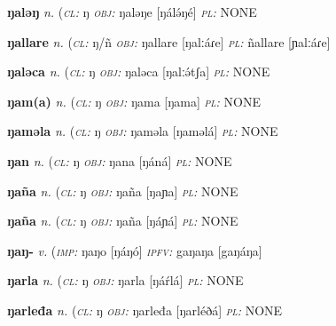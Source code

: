 {\newentry
\headword\textbf{ŋaləŋ}  
\ipa{[ŋálə́ŋ]}
\synpos\textit{n.} 
\class(\textit{\textsc{cl:}} {ŋ}
\object\textit{\textsc{obj:}} ŋaləŋe [ŋálə́ŋé]
\plural\textit{\textsc{pl:}} NONE

\newentry
\headword\textbf{ŋallare}  
\ipa{[ŋalːáɾe]}
\synpos\textit{n.} 
\class(\textit{\textsc{cl:}} {ŋ/ñ}
\object\textit{\textsc{obj:}} ŋallare [ŋalːáɾe]
\plural\textit{\textsc{pl:}} ñallare [ɲalːáɾe]

\newentry
\headword\textbf{ŋaləca}  
\synpos\textit{n.} 
\class(\textit{\textsc{cl:}} {ŋ}
\object\textit{\textsc{obj:}} ŋaləca [ŋalːə́tʃa]
\plural\textit{\textsc{pl:}} NONE

\newentry
\headword\textbf{ŋam(a)}  
\ipa{[ŋam(a)]}
\synpos\textit{n.} 
\class(\textit{\textsc{cl:}} {ŋ}
\object\textit{\textsc{obj:}} ŋama [ŋama]
\plural\textit{\textsc{pl:}} NONE 

\newentry
\headword\textbf{ŋaməla}  
\ipa{[ŋaməlá]}
\synpos\textit{n.} 
\class(\textit{\textsc{cl:}} {ŋ}
\object\textit{\textsc{obj:}} ŋaməla [ŋaməlá]
\plural\textit{\textsc{pl:}} NONE 

\newentry
\headword\textbf{ŋan}  
\ipa{[ŋán]}
\synpos\textit{n.} 
\class(\textit{\textsc{cl:}} {ŋ}
\object\textit{\textsc{obj:}} ŋana [ŋáná]
\plural\textit{\textsc{pl:}} NONE 

\newentry
\headword\textbf{ŋaña}  
\ipa{[ŋaɲa]}%
\synpos\textit{n.} 
\class(\textit{\textsc{cl:}} {ŋ}
\object\textit{\textsc{obj:}} ŋaña [ŋaɲa]
\plural\textit{\textsc{pl:}} NONE  

\newentry
\headword\textbf{ŋaña}  
\ipa{[ŋáɲá]}
\synpos\textit{n.} 
\class(\textit{\textsc{cl:}} {ŋ}
\object\textit{\textsc{obj:}} ŋaña [ŋáɲá]
\plural\textit{\textsc{pl:}} NONE 

\newentry
\headword\textbf{ŋaŋ-}  
\ipa{[ŋáŋ-]}
\synpos\textit{v.} 
\imperative(\textit {\textsc{imp:}} ŋaŋo [ŋáŋó]
\imperfective\textit{\textsc{ipfv:}} gaŋaŋa [gaŋáŋa] 

\newentry
\headword\textbf{ŋarla}  
\ipa{[ŋáŕlá]}
\synpos\textit{n.} 
\class(\textit{\textsc{cl:}} {ŋ}
\object\textit{\textsc{obj:}} ŋarla [ŋáŕlá]
\plural\textit{\textsc{pl:}} NONE 

\newentry
\headword\textbf{ŋarleđa}  
\ipa{[ŋarléðá]}
\synpos\textit{n.} 
\class(\textit{\textsc{cl:}} {ŋ}
\object\textit{\textsc{obj:}} ŋarleđa [ŋarléðá]
\plural\textit{\textsc{pl:}} NONE 

}
